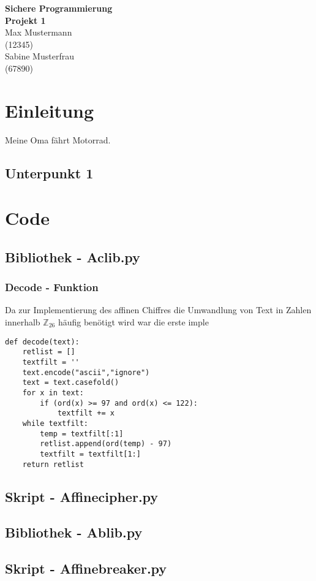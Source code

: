 \documentclass[12pt]{article}
\begin{document}
\begin{center}
  \textbf{\LARGE Sichere Programmierung} \\[1ex]%
  \textbf{\Large Projekt 1}\\[2ex] %
  Max Mustermann \\ %
  (12345) \\ %
  Sabine Musterfrau \\ %
  (67890) \\ %
  
\end{center}

\section{Einleitung}
Meine Oma fährt Motorrad.
\lipsum[1]

\subsection{Unterpunkt 1}
\section{Code}
\subsection{Bibliothek - Aclib.py}
\subsubsection{Decode - Funktion}
Da zur Implementierung des affinen Chiffres die Umwandlung von Text in Zahlen innerhalb $\mathbb{Z}_{26}$ häufig benötigt wird war die erste imple

\begin{lstlisting}
def decode(text):
    retlist = []
    textfilt = ''
    text.encode("ascii","ignore")
    text = text.casefold()
    for x in text:
        if (ord(x) >= 97 and ord(x) <= 122):
            textfilt += x
    while textfilt:
        temp = textfilt[:1]
        retlist.append(ord(temp) - 97)
        textfilt = textfilt[1:]
    return retlist
\end{lstlisting}
\subsection{Skript - Affinecipher.py}
\subsection{Bibliothek - Ablib.py}
\subsection{Skript - Affinebreaker.py}
\end{document}
